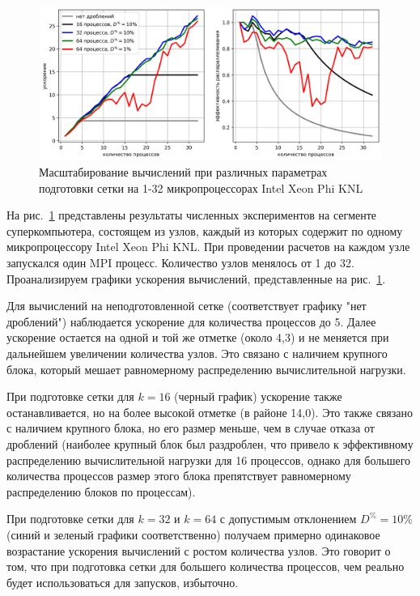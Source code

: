 \begin{figure}[ht]
\centering
\includegraphics[width=1.0\textwidth]{fig/par_scaling3.png}
\singlespacing
{}\caption{Масштабирование вычислений при различных параметрах подготовки сетки на 1-32 микропроцессорах Intel Xeon Phi KNL}
\label{fig:text_2_withcut_scaling3}
\end{figure}

На рис.~\ref{fig:text_2_withcut_scaling3} представлены результаты численных экспериментов на сегменте суперкомпьютера, состоящем из узлов, каждый из которых содержит по одному микропроцессору Intel Xeon Phi KNL.
При проведении расчетов на каждом узле запускался один MPI процесс.
Количество узлов менялось от 1 до 32.
Проанализируем графики ускорения вычислений, представленные на рис.~\ref{fig:text_2_withcut_scaling3}.

Для вычислений на неподготовленной сетке (соответствует графику "нет дроблений") наблюдается ускорение для количества процессов до 5.
Далее ускорение остается на одной и той же отметке (около 4,3) и не меняется при дальнейшем увеличении количества узлов.
Это связано с наличием крупного блока, который мешает равномерному распределению вычислительной нагрузки.

При подготовке сетки для $k = 16$ (черный график) ускорение также останавливается, но на более высокой отметке (в районе 14,0).
Это также связано с наличием крупного блока, но его размер меньше, чем в случае отказа от дроблений (наиболее крупный блок был раздроблен, что привело к эффективному распределению вычислительной нагрузки для 16 процессов, однако для большего количества процессов размер этого блока препятствует равномерному распределению блоков по процессам).

При подготовке сетки для $k = 32$ и $k = 64$ с допустимым отклонением $D^{\%} = 10\%$ (синий и зеленый графики соответственно) получаем примерно одинаковое возрастание ускорения вычислений с ростом количества узлов.
Это говорит о том, что при подготовка сетки для большего количества процессов, чем реально будет использоваться для запусков, избыточно.

